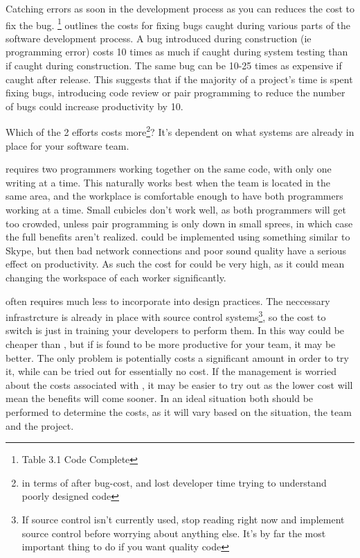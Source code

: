 \documentclass{article}
\begin{document}
Catching errors as soon in the development process as you can reduces the cost to fix the bug. \cite{avgCostOfDefect}\footnote{Table 3.1 Code Complete} outlines the costs for fixing bugs caught during various parts of the software development process. A bug introduced during construction (ie programming error) costs 10 times as much if caught during system testing than if caught during construction. The same bug can be 10-25 times as expensive if caught after release. This suggests that if the majority of a project's time is spent fixing bugs, introducing code review or pair programming to reduce the number of bugs could increase productivity by 10.

Which of the 2 efforts costs more\footnote{in terms of after bug-cost, and lost developer time trying to understand poorly designed code}? It's dependent on what systems are already in place for your software team. 

\PP requires two programmers working together on the same code, with only one writing at a time. This naturally works best when the team is located in the same area, and the workplace is comfortable enough to have both programmers working at a time. Small cubicles don't work well, as both programmers will get too crowded, unless pair programming is only down in small sprees, in which case the full benefits aren't realized. \PP could be implemented using something similar to Skype, but then bad network connections and poor sound quality have a serious effect on productivity. As such the cost for \PP could be very high, as it could mean changing the workspace of each worker significantly.

\CR often requires much less to incorporate into design practices. The neccessary infrastrcture is already in place with source control systems\footnote{If source control isn't currently used, stop reading right now and implement source control before worrying about anything else. It's by far the most important thing to do if you want quality code}, so the cost to switch is just in training your developers to perform them. In this way \CR could be cheaper than \PP, but if \PP is found to be more productive for your team, it may be better. The only problem is \PP potentially costs a significant amount in order to try it, while \CR can be tried out for essentially no cost. If the management is worried about the costs associated with \PP, it may be easier to try out \CR as the lower cost will mean the benefits will come sooner. In an ideal situation both should be performed to determine the costs, as it will vary based on the situation, the team and the project.
\end{document}
